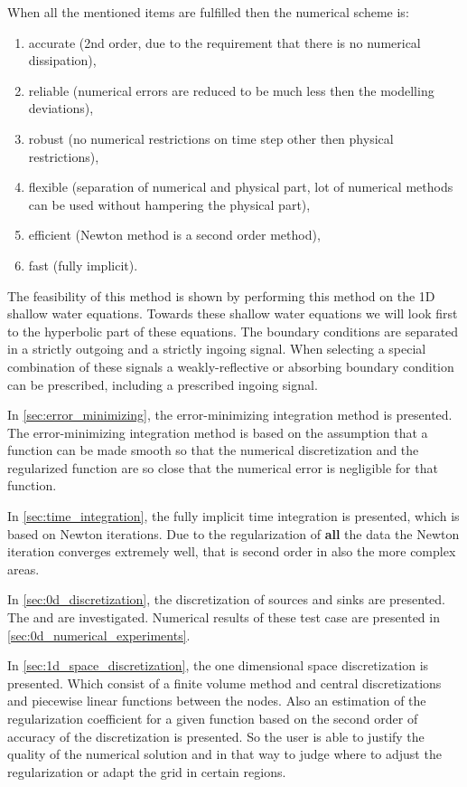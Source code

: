 When all the mentioned items are fulfilled then the numerical scheme is:
\begin{enumerate}
\item accurate (2nd order, due to the requirement that there is no numerical dissipation),
\item reliable (numerical errors are reduced to be much less then the modelling deviations),
\item robust (no numerical restrictions on time step other then physical restrictions),
\item flexible (separation of numerical and physical part, lot of numerical methods can be used without hampering the physical part),
\item efficient (Newton method is a second order method),
\item fast (fully implicit).
\end{enumerate}

The feasibility of this method is shown by performing this method on the 1D shallow water equations.
Towards these shallow water equations we will look first to the hyperbolic part of these equations.
The boundary conditions are separated in a strictly outgoing and a strictly ingoing signal.
When selecting a special combination of these signals a weakly-reflective or absorbing boundary condition can be prescribed, including a prescribed ingoing signal.


In \autoref{sec:error_minimizing}, the error-minimizing integration method is presented.
The error-minimizing integration method is based on the assumption that a function can be made smooth so that the numerical discretization and the regularized function are so close that the numerical error is negligible for that function.

In \autoref{sec:time_integration}, the fully implicit time integration is presented, which is based on Newton iterations.
Due to the regularization of \textbf{all} the data the Newton iteration converges extremely well, that is second order in also the more complex areas.

In \autoref{sec:0d_discretization}, the discretization of sources and sinks are presented. The  and  are investigated.
Numerical results of these test case are presented in \autoref{sec:0d_numerical_experiments}.

In \autoref{sec:1d_space_discretization}, the one dimensional space discretization is presented.
Which consist of a finite volume method and central discretizations and piecewise linear functions between the nodes.
Also an estimation of the regularization coefficient for a given function based on the second order of accuracy of the discretization is presented.
So the user is able to justify the quality of the numerical solution and in that way to judge where to adjust the regularization or adapt the grid in certain regions.

